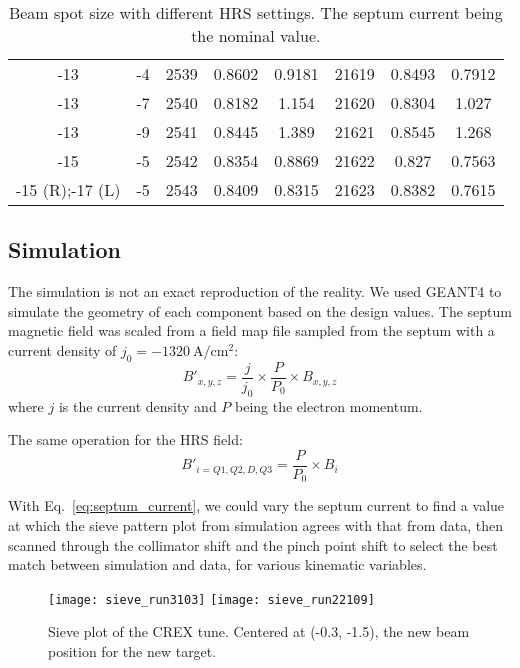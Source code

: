 \begin{table}[h!]
\begin{tabular}{c c | c c c | c c c}
	-13 & -4    & 2539  & 0.8602	& 0.9181    & 21619	& 0.8493    & 0.7912  \\
	-13 & -7    & 2540  & 0.8182	& 1.154	    & 21620	& 0.8304    & 1.027   \\
	-13 & -9    & 2541  & 0.8445	& 1.389	    & 21621	& 0.8545    & 1.268   \\
	-15 & -5    & 2542  & 0.8354	& 0.8869    & 21622	& 0.827	    & 0.7563  \\
	\hline
	-15 (R);-17 (L)	& -5	&2543	& 0.8409	& 0.8315  & 21623 & 0.8382	& 0.7615  \\
	\hline
    \end{tabular}
    \caption{Beam spot size with different HRS settings. The septum current being 
    the nominal value.}
\end{table}

\subsection{Simulation}
The simulation is not an exact reproduction of the reality. We used GEANT4 to
simulate the geometry of each component based on the design values. The
septum magnetic field was scaled from a field map file sampled from the septum
with a current density of $j_0 = -1320\ \mathrm{A}/\mathrm{cm}^2$: %
\begin{equation}
    B'_{x,y,z} = \frac{j}{j_0} \times \frac{P}{P_0} \times B_{x,y,z}
    \label{eq:septum_current}
\end{equation}
where $j$ is the current density and $P$ being the electron momentum.

The same operation for the HRS field: %
\begin{equation}
    B'_{i = Q1, Q2, D, Q3} = \frac{P}{P_0} \times B_i
\end{equation}

With Eq.~\ref{eq:septum_current}, we could vary the septum current to find a value
at which the sieve pattern plot from simulation agrees with that from data,
then scanned through the collimator shift and the pinch point shift to select the 
best match between simulation and data, for various kinematic variables.

\begin{figure}[H]
    \texttt{[image: sieve\_run3103]}
    \texttt{[image: sieve\_run22109]}
    \caption{Sieve plot of the CREX tune. Centered at (-0.3, -1.5), the new beam 
    position for the new target.}
\end{figure}

